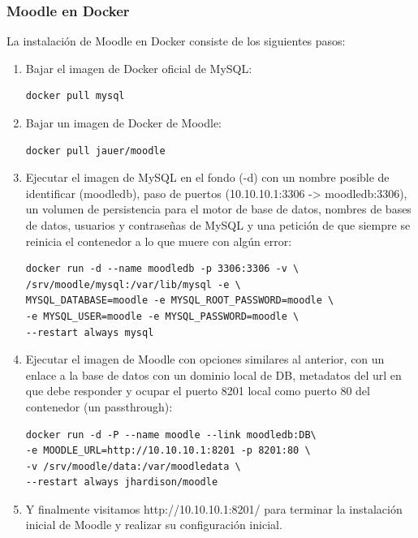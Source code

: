 \subsubsection{Moodle en Docker}
La instalación de Moodle en Docker consiste de los siguientes pasos:
\begin{enumerate}
	\item Bajar el imagen de Docker oficial de MySQL:
    \begin{lstlisting}    
docker pull mysql
    \end{lstlisting}
    \item Bajar un imagen de Docker de Moodle:
    \begin{lstlisting}    
docker pull jauer/moodle
    \end{lstlisting}
    \item Ejecutar el imagen de MySQL en el fondo (-d) con un nombre posible de identificar (moodledb), paso de puertos (10.10.10.1:3306 -> moodledb:3306), un volumen de persistencia para el motor de base de datos, nombres de bases de datos, usuarios y contraseñas de MySQL y una petición de que siempre se reinicia el contenedor a lo que muere con algún error:
    \begin{lstlisting}    
docker run -d --name moodledb -p 3306:3306 -v \
/srv/moodle/mysql:/var/lib/mysql -e \
MYSQL_DATABASE=moodle -e MYSQL_ROOT_PASSWORD=moodle \
-e MYSQL_USER=moodle -e MYSQL_PASSWORD=moodle \
--restart always mysql
    \end{lstlisting}
    \item Ejecutar el imagen de Moodle con opciones similares al anterior, con un enlace a la base de datos con un dominio local de DB, metadatos del url en que debe responder y ocupar el puerto 8201 local como puerto 80 del contenedor (un passthrough):
    \begin{lstlisting}    
docker run -d -P --name moodle --link moodledb:DB\
-e MOODLE_URL=http://10.10.10.1:8201 -p 8201:80 \
-v /srv/moodle/data:/var/moodledata \
--restart always jhardison/moodle
    \end{lstlisting}
    \item Y finalmente visitamos http://10.10.10.1:8201/ para terminar la instalación inicial de Moodle y realizar su configuración inicial.
\end{enumerate}

